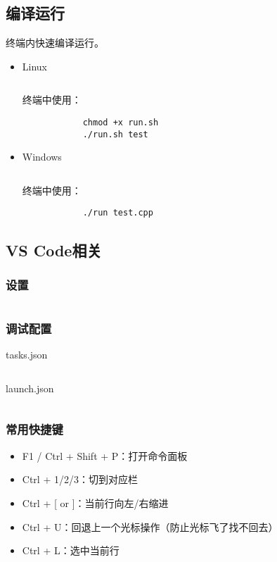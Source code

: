 \documentclass[a4paper, twoside]{article}
\begin{document}
\subsection{编译运行}
    终端内快速编译运行。
    \begin{itemize}
        \item Linux
        \inputminted{bash}{../src/附录/Linux编译运行脚本.sh}
        终端中使用：
        \begin{verbatim}
            chmod +x run.sh
            ./run.sh test        
        \end{verbatim}
        \item Windows
        \inputminted{batch}{../src/附录/Windows编译运行脚本.bat}
        终端中使用：
        \begin{verbatim}
            ./run test.cpp     
        \end{verbatim}
    \end{itemize}

\subsection{VS Code相关}
    \subsubsection{设置}
    \inputminted{json}{../src/附录/VSCode/settings.json}

    \subsubsection{调试配置}
    tasks.json
    \inputminted{json}{../src/附录/VSCode/tasks.json}
    launch.json
    \inputminted{json}{../src/附录/VSCode/launch.json}

    \subsubsection{常用快捷键}
    \begin{itemize}
        \item F1 / Ctrl + Shift + P：打开命令面板
        \item Ctrl + 1/2/3：切到对应栏
        \item Ctrl + [ or ]：当前行向左/右缩进
        \item Ctrl + U：回退上一个光标操作（防止光标飞了找不回去）
        \item Ctrl + L：选中当前行
    \end{itemize}
\end{document}
